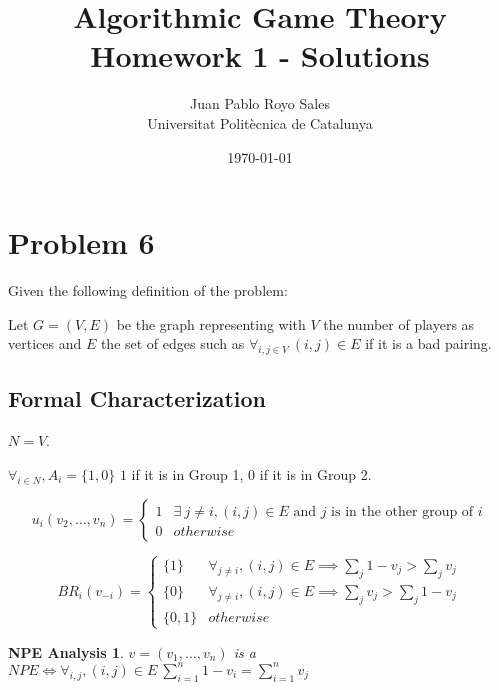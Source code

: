 \documentclass[12pt, a4paper]{article}
\title{%
  Algorithmic Game Theory \\
  Homework 1 - Solutions
}
\author{%
  Juan Pablo Royo Sales\\
  \small{Universitat Politècnica de Catalunya}
}
\date\today
\begin{document}
\maketitle

\section{Problem 6}
Given the following definition of the problem:

Let $G=(V,E)$ be the graph representing with $V$ the number of players as vertices and $E$ the set of edges such as $\forall_{i,j \in V}\ (i,j) \in E$ if it is a bad pairing.

\subsection{Formal Characterization}

$N = V$.

$\forall_{i \in N}, A_i = \{1,0\}$ $1$ if it is in Group 1, $0$ if it is in Group 2.

\[
u_i(v_2,\dots,v_n) = 
    \begin{cases}
      1 & \exists\ j \neq i, (i,j) \in E \text{ and $j$ is in the other group of $i$} \\
      0 & otherwise 
    \end{cases} 
\]

\[
BR_i(v_{-i}) = 
    \begin{cases}
      \{1\} & \forall_{j \neq i}, (i,j) \in E \implies \sum_j 1 - v_j > \sum_j v_j\\ 
      \{0\} & \forall_{j \neq i}, (i,j) \in E \implies \sum_j v_j > \sum_j 1 - v_j\\
      \{0,1\} & otherwise
    \end{cases}
\]

\newtheorem{npe}{NPE Analysis}
\newtheorem{proofpart}{Part}
\begin{npe}
  $v=(v_1,\dots,v_n)$ is a $NPE \iff \forall_{i,j}, (i,j) \in E\ \sum_{i=1}^n 1 - v_i = \sum_{i=1}^n v_j$
\end{npe}
\end{document}
